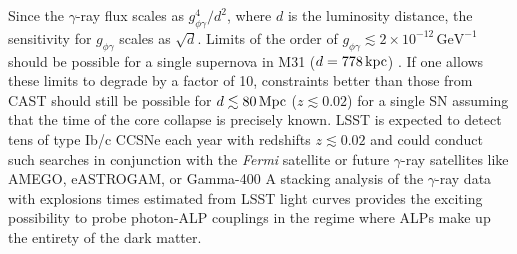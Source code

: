 Since the $\gamma$-ray flux scales as $g_{\phi\gamma}^4 / d^2$, where $d$ is the luminosity distance, the sensitivity for $g_{\phi\gamma}$ scales as $\sqrt{d}$. 
Limits of the order of $g_{\phi\gamma} \lesssim 2\times10^{-12}\,\mathrm{GeV}^{-1}$ should be possible for a single supernova in M31 ($d=778\mathrm{\,kpc}$) \citep{2017PhRvL.118a1103M}. 
If one allows these limits to degrade by a factor of 10, constraints better than those from CAST should still be possible for $d\lesssim 80\mathrm{\,Mpc}$ ($z \lesssim 0.02$) for a single SN assuming that the time of the core collapse is precisely known. 
LSST is expected to detect tens of type Ib/c CCSNe each year with redshifts $z \lesssim 0.02$ \citep{Goldstein:2018} and could conduct such searches in conjunction with the \textit{Fermi} satellite or future $\gamma$-ray satellites like AMEGO, eASTROGAM, or Gamma-400 \citep[\eg,][]{2017ICRC...35..910C,1502.02976} 
A stacking analysis of the $\gamma$-ray data with explosions times estimated from LSST light curves provides the exciting possibility to probe photon-ALP couplings in the regime where ALPs make up the entirety of the dark matter.
